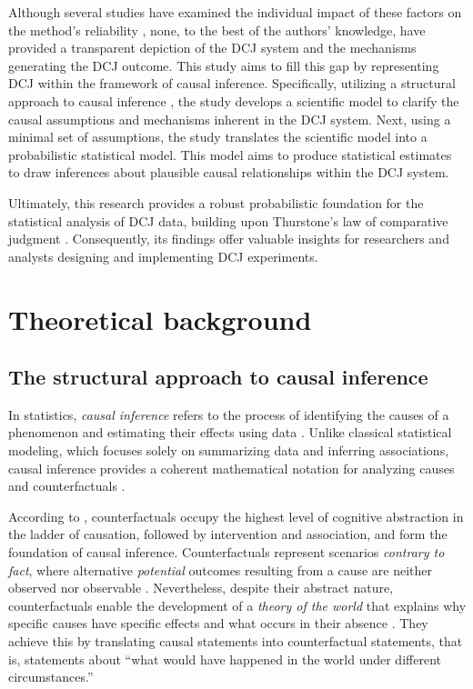 \documentclass[
  authoryear,
  preprint,
  1p]{elsarticle}
\begin{document}
Although several studies have examined the individual impact of these
factors on the method's reliability
\citep{Bramley_2015, Pollitt_2012b, Bramley_et_al_2019, Verhavert_et_al_2019, Crompvoets_et_al_2022, vanDaal_et_al_2017, Gijsen_et_al_2021},
none, to the best of the authors' knowledge, have provided a transparent
depiction of the DCJ system and the mechanisms generating the DCJ
outcome. This study aims to fill this gap by representing DCJ within the
framework of causal inference. Specifically, utilizing a structural
approach to causal inference
\citep{Wright_1921, Pearl_2009, Pearl_et_al_2016}, the study develops a
scientific model to clarify the causal assumptions and mechanisms
inherent in the DCJ system. Next, using a minimal set of assumptions,
the study translates the scientific model into a probabilistic
statistical model. This model aims to produce statistical estimates to
draw inferences about plausible causal relationships within the DCJ
system.

Ultimately, this research provides a robust probabilistic foundation for
the statistical analysis of DCJ data, building upon Thurstone's law of
comparative judgment \citeyearpar{Thurstone_1927}. Consequently, its
findings offer valuable insights for researchers and analysts designing
and implementing DCJ experiments.

\section{Theoretical background}\label{sec-background}

\subsection{The structural approach to causal
inference}\label{sec-background-structural}

In statistics, \emph{causal inference} refers to the process of
identifying the causes of a phenomenon and estimating their effects
using data \citep{Shaughnessy_et_al_2010, Neal_2020}. Unlike classical
statistical modeling, which focuses solely on summarizing data and
inferring associations, causal inference provides a coherent
mathematical notation for analyzing causes and counterfactuals
\citep{Pearl_2009}.

According to \citet{Pearl_et_al_2018}, counterfactuals occupy the
highest level of cognitive abstraction in the ladder of causation,
followed by intervention and association, and form the foundation of
causal inference. Counterfactuals represent scenarios \emph{contrary to
fact}, where alternative \emph{potential} outcomes resulting from a
cause are neither observed nor observable
\citep{Neal_2020, Counterfactual_2024}. Nevertheless, despite their
abstract nature, counterfactuals enable the development of a
\emph{theory of the world} that explains why specific causes have
specific effects and what occurs in their absence
\citep{Pearl_et_al_2018}. They achieve this by translating causal
statements into counterfactual statements, that is, statements about
``what would have happened in the world under different circumstances.''
\end{document}
